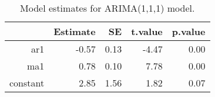 \begin{table}[ht]
\centering
\begin{tabular}{rrrrr}
  \hline
 & Estimate & SE & t.value & p.value \\ 
  \hline
ar1 & -0.57 & 0.13 & -4.47 & 0.00 \\ 
  ma1 & 0.78 & 0.10 & 7.78 & 0.00 \\ 
  constant & 2.85 & 1.56 & 1.82 & 0.07 \\ 
   \hline
\end{tabular}
\caption{Model estimates for ARIMA(1,1,1) model.}
\end{table}